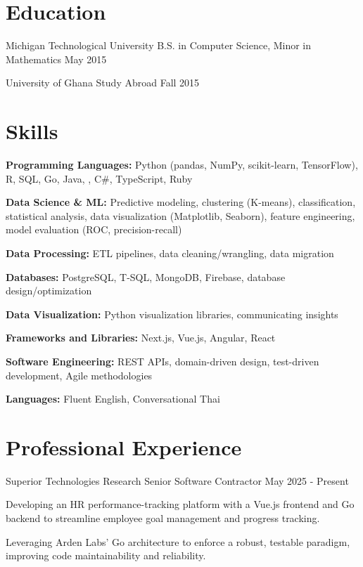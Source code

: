 \documentclass{../styles/cv}
\begin{document}
\populatedtitle

\section{Education}
\subsectionlocationdate
    {Michigan Technological University}
    {B.S. in Computer Science, Minor in Mathematics}
    {May 2015}

\subsectionlocationdate
    {University of Ghana}
    {Study Abroad}
    {Fall 2015}


\section{Skills}
\resumesublistbegin
    \item \textbf{Programming Languages:} Python (pandas, NumPy, scikit-learn, TensorFlow), R, SQL, Go, Java, \cpp, C\#, TypeScript, Ruby
    \item \textbf{Data Science \& ML:} Predictive modeling, clustering (K-means), classification, statistical analysis, data visualization (Matplotlib, Seaborn), feature engineering, model evaluation (ROC, precision-recall)
    \item \textbf{Data Processing:} ETL pipelines, data cleaning/wrangling, data migration
    \item \textbf{Databases:} PostgreSQL, T-SQL, MongoDB, Firebase, database design/optimization
    \item \textbf{Data Visualization:} Python visualization libraries, communicating insights
    \item \textbf{Frameworks and Libraries:} Next.js, Vue.js, Angular, React
    \item \textbf{Software Engineering:} REST APIs, domain-driven design, test-driven development, Agile methodologies
    \item \textbf{Languages:} Fluent English, Conversational Thai
\resumesublistend

\section{Professional Experience}

\subsectionpositiondate
    {Superior Technologies Research}
    {Senior Software Contractor}
    {May 2025 - Present}
\resumesublistbegin
    \item Developing an HR performance-tracking platform with a Vue.js frontend and Go backend to streamline employee goal management and progress tracking.
    \item Leveraging Arden Labs' Go architecture to enforce a robust, testable paradigm, improving code maintainability and reliability.
\resumesublistend
\end{document}
